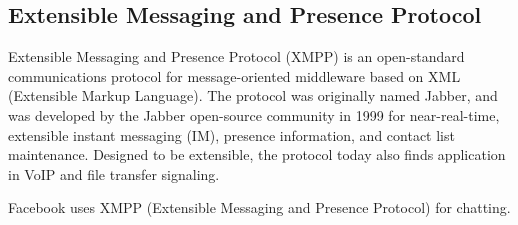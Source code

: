 \subsection{Extensible Messaging and Presence Protocol}
Extensible Messaging and Presence Protocol (XMPP) is an open-standard communications protocol for message-oriented middleware based on 
XML (Extensible Markup Language). The protocol was originally named Jabber, and was developed by the Jabber open-source community 
in 1999 for near-real-time, extensible instant messaging (IM), presence information, and contact list maintenance. Designed to 
be extensible, the protocol today also finds application in VoIP and file transfer signaling.\cite{wiki_xmpp}

Facebook uses XMPP (Extensible Messaging and Presence Protocol) for chatting.	


